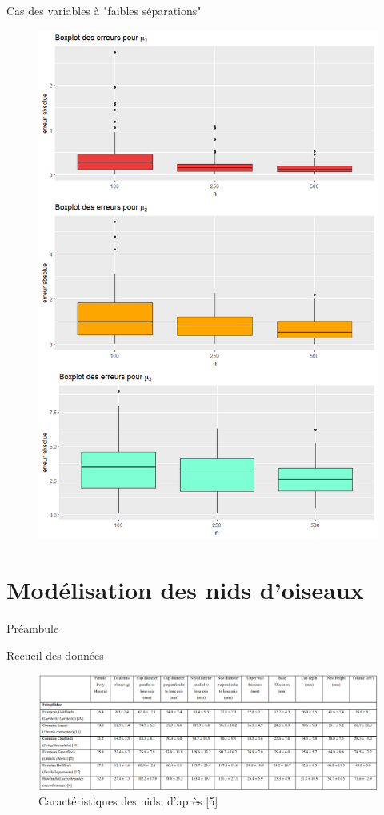 \documentclass[11pt]{beamer}
\begin{document}
\begin{frame}{Cas des variables à "faibles séparations" }
\begin{figure}[htp]
{				\includegraphics[scale=0.18]{images/bad_mu.png}%
			}%
		\end{figure}
	\end{frame}
	
	\section{Modélisation des nids d'oiseaux}

	\begin{frame}{Préambule}
		\begin{block}{Recueil des données}
			\begin{figure}[H]
				\centering
				\includegraphics[scale=0.29]{tab_oiseaux.png}
				\caption{Caractéristiques des nids; d'après [5]}
			\end{figure}
		\end{block}
	\end{frame}	
\end{document}
